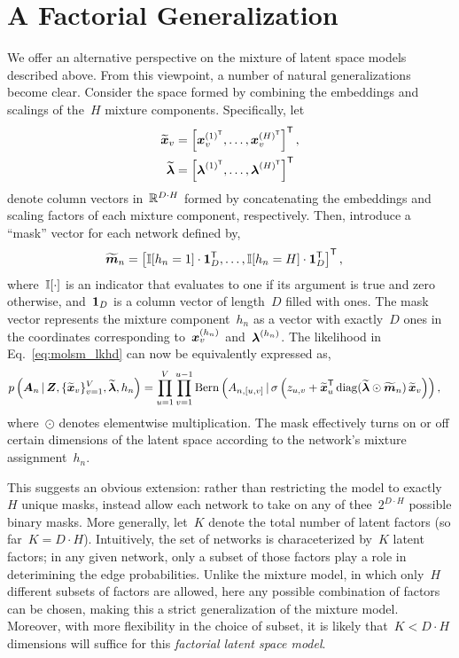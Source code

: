 \section{A Factorial Generalization}
We offer an alternative perspective on the mixture of latent
space models described above.  From this viewpoint, a number
of natural generalizations become clear. Consider the space
formed by combining the embeddings and scalings of the~$H$
mixture components.  Specifically, let
\begin{align}
  \widetilde{\boldsymbol{x}}_v &= \left[\boldsymbol{x}_v^{(1)^{\mathsf{T}}}, \ldots, \boldsymbol{x}_v^{(H)^{\mathsf{T}}}\right]^{\mathsf{T}}, \\
  \widetilde{\boldsymbol{\lambda}} &= \left[\boldsymbol{\lambda}^{(1)^{\mathsf{T}}}, \ldots, \boldsymbol{\lambda}^{(H)^{\mathsf{T}}} \right]^{\mathsf{T}}
\end{align}
denote column vectors in~$\mathbb{R}^{D \cdot H}$ formed by concatenating the
embeddings and scaling factors of each mixture component, respectively.
Then, introduce a ``mask'' vector for each network defined by,
\begin{align}
  \widetilde{\boldsymbol{m}}_n &= \left[ \mathbb{I}[h_n=1] \cdot \boldsymbol{1}_D^{\mathsf{T}}, \ldots, \mathbb{I}[h_n=H] \cdot \boldsymbol{1}_D^{\mathsf{T}} \right]^{\mathsf{T}},
\end{align}
where~$\mathbb{I}[\cdot]$ is an indicator that evaluates to one if its
argument is true and zero otherwise, and~$\boldsymbol{1}_D$ is a column vector
of length~$D$ filled with ones. The mask vector represents
the mixture component~$h_n$ as a
vector with exactly~$D$ ones in the coordinates corresponding
to~$\boldsymbol{x}_v^{(h_n)}$ and~$\boldsymbol{\lambda}^{(h_n)}$. The likelihood in Eq.~\eqref{eq:molsm_lkhd} can now
be equivalently expressed as,
\begin{align}
  p \left(\boldsymbol{A}_n \, | \,
  \boldsymbol{Z}, \{\widetilde{\boldsymbol{x}}_v\}_{v=1}^V,
  \widetilde{\boldsymbol{\lambda}}, h_n \right) 
  &= \prod_{u=1}^V \prod_{v=1}^{u-1}
  \mathrm{Bern} \left(A_{n,[u,v]} \, | \,
    \sigma \left(z_{u,v} + \widetilde{\boldsymbol{x}}_{u}^{\mathsf{T}}
    \operatorname{diag}(\widetilde{\boldsymbol{\lambda}} \odot \widetilde{\boldsymbol{m}}_n) \,
    \widetilde{\boldsymbol{x}}_v \right) \right),
\end{align}
where~$\odot$ denotes elementwise multiplication. The mask effectively
turns on or off certain dimensions of the latent space according to
the network's mixture assignment~$h_n$.

This suggests an obvious extension: rather than restricting the model
to exactly~$H$ unique masks, instead allow each network to take on any
of thee~$2^{D \cdot H}$ possible binary masks. More generally, let~$K$
denote the total number of latent factors (so far~${K=D \cdot
  H}$). Intuitively, the set of networks is characeterized by~$K$
latent factors; in any given network, only a subset of those factors
play a role in deterimining the edge probabilities. Unlike the mixture
model, in which only~$H$ different subsets of factors are allowed, here any
possible combination of factors can be chosen, making this a strict
generalization of the mixture model.  Moreover, with more flexibility
in the choice of subset, it is likely that~${K < D \cdot H}$
dimensions will suffice for this \emph{factorial latent space model}.

